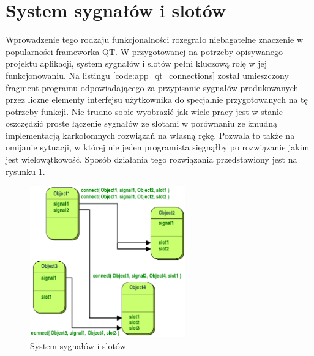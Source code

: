  \section{System sygnałów i slotów}
        Wprowadzenie tego rodzaju funkcjonalności rozegrało niebagatelne znaczenie w popularności frameworka QT. W przygotowanej na potrzeby opisywanego projektu aplikacji, system sygnałów i slotów pełni kluczową rolę w jej funkcjonowaniu. Na listingu \ref{code:app_qt_connections} został umieszczony fragment programu odpowiadającego za przypisanie sygnałów produkowanych przez liczne elementy interfejsu użytkownika do specjalnie przygotowanych na tę potrzeby funkcji. Nie trudno sobie wyobrazić jak wiele pracy jest w stanie oszczędzić proste łączenie sygnałów ze slotami w porównaniu ze żmudną implementacją karkołomnych rozwiązań na własną rękę. Pozwala to także na omijanie sytuacji, w której nie jeden programista sięgnąłby po rozwiązanie jakim jest wielowątkowość. Sposób działania tego rozwiązania przedstawiony jest na rysunku \ref{fig:s&s}.
        
       \begin{figure}[ht]
          \centering
          \includegraphics[width=0.6\textwidth]{img/abstract-connections.png}
          \caption{System sygnałów i slotów}
          \label{fig:s&s}
        \end{figure}     
        
        \begin{kod}
          \inputminted[firstline=18, lastline=39]{cpp}{app/listings/mainwindow.cpp}
          \caption{Użycie systemu sygnałów i slotów}
          \label{code:app_qt_connections}
        \end{kod}
        

